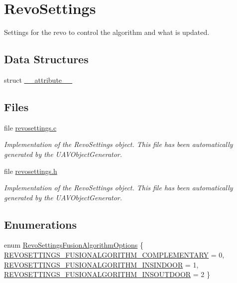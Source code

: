 \hypertarget{group___revo_settings}{\section{\-Revo\-Settings}
\label{group___revo_settings}
}


\-Settings for the revo to control the algorithm and what is updated.  


\subsection*{\-Data \-Structures}
\begin{DoxyCompactItemize}
\item 
struct \hyperlink{struct____attribute____}{\-\_\-\-\_\-attribute\-\_\-\-\_\-}
\end{DoxyCompactItemize}
\subsection*{\-Files}
\begin{DoxyCompactItemize}
\item 
file \hyperlink{revosettings_8c}{revosettings.\-c}
\begin{DoxyCompactList}\small\item\em \-Implementation of the \-Revo\-Settings object. \-This file has been automatically generated by the \-U\-A\-V\-Object\-Generator. \end{DoxyCompactList}\item 
file \hyperlink{revosettings_8h}{revosettings.\-h}
\begin{DoxyCompactList}\small\item\em \-Implementation of the \-Revo\-Settings object. \-This file has been automatically generated by the \-U\-A\-V\-Object\-Generator. \end{DoxyCompactList}\end{DoxyCompactItemize}
\subsection*{\-Enumerations}
\begin{DoxyCompactItemize}
\item 
enum \hyperlink{group___revo_settings_gaae8b42fd247e21d153578e2a7795e027}{\-Revo\-Settings\-Fusion\-Algorithm\-Options} \{ \hyperlink{group___revo_settings_ggaae8b42fd247e21d153578e2a7795e027a4b1fd35e453f127fcb83e057bd62155f}{\-R\-E\-V\-O\-S\-E\-T\-T\-I\-N\-G\-S\-\_\-\-F\-U\-S\-I\-O\-N\-A\-L\-G\-O\-R\-I\-T\-H\-M\-\_\-\-C\-O\-M\-P\-L\-E\-M\-E\-N\-T\-A\-R\-Y} = 0, 
\hyperlink{group___revo_settings_ggaae8b42fd247e21d153578e2a7795e027aec0498f1c9a96beff1c01abcdee2d58c}{\-R\-E\-V\-O\-S\-E\-T\-T\-I\-N\-G\-S\-\_\-\-F\-U\-S\-I\-O\-N\-A\-L\-G\-O\-R\-I\-T\-H\-M\-\_\-\-I\-N\-S\-I\-N\-D\-O\-O\-R} = 1, 
\hyperlink{group___revo_settings_ggaae8b42fd247e21d153578e2a7795e027a588da2bdb22962a1d458c13aec358ceb}{\-R\-E\-V\-O\-S\-E\-T\-T\-I\-N\-G\-S\-\_\-\-F\-U\-S\-I\-O\-N\-A\-L\-G\-O\-R\-I\-T\-H\-M\-\_\-\-I\-N\-S\-O\-U\-T\-D\-O\-O\-R} = 2
 \}
\end{DoxyCompactItemize}
